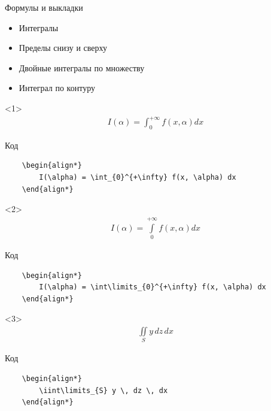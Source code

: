 \begin{frame}[fragile]{Формулы и выкладки}

\begin{itemize}[<+->]
    \item Интегралы
    \item Пределы снизу и сверху
    \item Двойные интегралы по множеству
    \item Интеграл по контуру
\end{itemize}

\begin{onlyenv}<1>
    \begin{align*}
        I(\alpha) = \int_{0}^{+\infty} f(x, \alpha) dx
    \end{align*}

    \begin{block}{Код}
        \begin{lstlisting}
    \begin{align*}
        I(\alpha) = \int_{0}^{+\infty} f(x, \alpha) dx
    \end{align*}
        \end{lstlisting}
    \end{block}
\end{onlyenv}

\begin{onlyenv}<2>
    \begin{align*}
        I(\alpha) = \int\limits_{0}^{+\infty} f(x, \alpha) dx
    \end{align*}

    \begin{block}{Код}
        \begin{lstlisting}
    \begin{align*}
        I(\alpha) = \int\limits_{0}^{+\infty} f(x, \alpha) dx
    \end{align*}
        \end{lstlisting}
    \end{block}
\end{onlyenv}

\begin{onlyenv}<3>
    \begin{align*}
        \iint\limits_{S} y \, dz \, dx
    \end{align*}

    \begin{block}{Код}
        \begin{lstlisting}
    \begin{align*}
        \iint\limits_{S} y \, dz \, dx
    \end{align*}
        \end{lstlisting}
    \end{block}
\end{onlyenv}


\end{frame}
